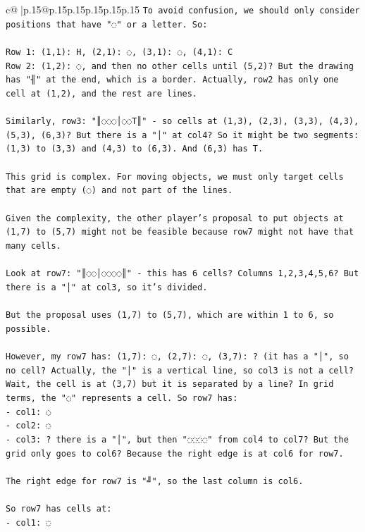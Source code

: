 \documentclass{article}
\begin{document}
{\begin{supertabular}{c@{$\;$}|p{.15\linewidth}@{}p{.15\linewidth}p{.15\linewidth}p{.15\linewidth}p{.15\linewidth}p{.15\linewidth}}
{{{\texttt{To avoid confusion, we should only consider positions that have "◌" or a letter. So:} \\
\\ 
\texttt{Row 1: (1,1): H, (2,1): ◌, (3,1): ◌, (4,1): C} \\
\texttt{Row 2: (1,2): ◌, and then no other cells until (5,2)? But the drawing has "╢" at the end, which is a border. Actually, row2 has only one cell at (1,2), and the rest are lines.} \\
\\ 
\texttt{Similarly, row3: "║◌◌◌│◌◌T║" {-} so cells at (1,3), (2,3), (3,3), (4,3), (5,3), (6,3)? But there is a "│" at col4? So it might be two segments: (1,3) to (3,3) and (4,3) to (6,3). And (6,3) has T.} \\
\\ 
\texttt{This grid is complex. For moving objects, we must only target cells that are empty (◌) and not part of the lines.} \\
\\ 
\texttt{Given the complexity, the other player's proposal to put objects at (1,7) to (5,7) might not be feasible because row7 might not have that many cells.} \\
\\ 
\texttt{Look at row7: "║◌◌│◌◌◌◌║" {-} this has 6 cells? Columns 1,2,3,4,5,6? But there is a "│" at col3, so it's divided.} \\
\\ 
\texttt{But the proposal uses (1,7) to (5,7), which are within 1 to 6, so possible.} \\
\\ 
\texttt{However, my row7 has: (1,7): ◌, (2,7): ◌, (3,7): ? (it has a "│", so no cell? Actually, the "│" is a vertical line, so col3 is not a cell? Wait, the cell is at (3,7) but it is separated by a line? In grid terms, the "◌" represents a cell. So row7 has:} \\
\texttt{{-} col1: ◌} \\
\texttt{{-} col2: ◌} \\
\texttt{{-} col3: ? there is a "│", but then "◌◌◌◌" from col4 to col7? But the grid only goes to col6? Because the right edge is at col6 for row7.} \\
\\ 
\texttt{The right edge for row7 is "╝", so the last column is col6.} \\
\\ 
\texttt{So row7 has cells at:} \\
\texttt{{-} col1: ◌} \\
}}}
\end{supertabular}}
\end{document}
